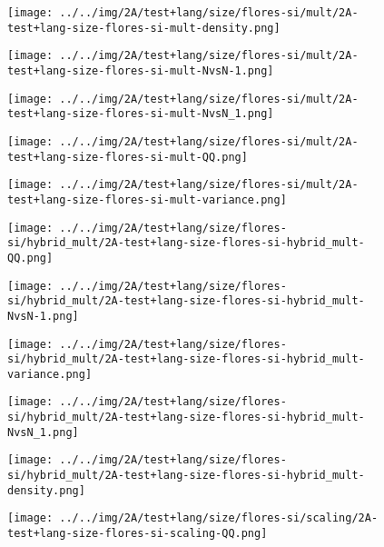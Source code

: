 \begin{figure}[H]
\centering	\texttt{[image: ../../img/2A/test+lang/size/flores-si/mult/2A-test+lang-size-flores-si-mult-density.png]}
\end{figure}
\begin{figure}[H]
\centering	\texttt{[image: ../../img/2A/test+lang/size/flores-si/mult/2A-test+lang-size-flores-si-mult-NvsN-1.png]}
\end{figure}
\begin{figure}[H]
\centering	\texttt{[image: ../../img/2A/test+lang/size/flores-si/mult/2A-test+lang-size-flores-si-mult-NvsN\_1.png]}
\end{figure}
\begin{figure}[H]
\centering	\texttt{[image: ../../img/2A/test+lang/size/flores-si/mult/2A-test+lang-size-flores-si-mult-QQ.png]}
\end{figure}
\begin{figure}[H]
\centering	\texttt{[image: ../../img/2A/test+lang/size/flores-si/mult/2A-test+lang-size-flores-si-mult-variance.png]}
\end{figure}
\begin{figure}[H]
\centering	\texttt{[image: ../../img/2A/test+lang/size/flores-si/hybrid\_mult/2A-test+lang-size-flores-si-hybrid\_mult-QQ.png]}
\end{figure}
\begin{figure}[H]
\centering	\texttt{[image: ../../img/2A/test+lang/size/flores-si/hybrid\_mult/2A-test+lang-size-flores-si-hybrid\_mult-NvsN-1.png]}
\end{figure}
\begin{figure}[H]
\centering	\texttt{[image: ../../img/2A/test+lang/size/flores-si/hybrid\_mult/2A-test+lang-size-flores-si-hybrid\_mult-variance.png]}
\end{figure}
\begin{figure}[H]
\centering	\texttt{[image: ../../img/2A/test+lang/size/flores-si/hybrid\_mult/2A-test+lang-size-flores-si-hybrid\_mult-NvsN\_1.png]}
\end{figure}
\begin{figure}[H]
\centering	\texttt{[image: ../../img/2A/test+lang/size/flores-si/hybrid\_mult/2A-test+lang-size-flores-si-hybrid\_mult-density.png]}
\end{figure}
\begin{figure}[H]
\centering	\texttt{[image: ../../img/2A/test+lang/size/flores-si/scaling/2A-test+lang-size-flores-si-scaling-QQ.png]}
\end{figure}
